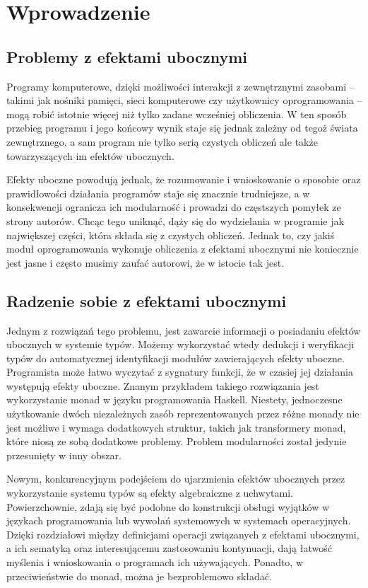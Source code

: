\documentclass[shortabstract]{iithesis}
\author         {Jakub Mendyk}
\date          {4 września 2020}                     %
\begin{document}

\chapter{Wprowadzenie}

\section{Problemy z efektami ubocznymi}

Programy komputerowe, dzięki możliwości interakcji z zewnętrznymi zasobami -- takimi jak nośniki pamięci, sieci komputerowe czy użytkownicy oprogramowania -- mogą robić istotnie więcej niż tylko zadane wcześniej obliczenia. W ten sposób przebieg programu i jego końcowy wynik staje się jednak zależny od tegoż świata zewnętrznego, a sam program nie tylko serią czystych obliczeń ale także towarzyszących im efektów ubocznych.

Efekty uboczne powodują jednak, że rozumowanie i wnioskowanie o sposobie oraz prawidłowości działania programów staje się znacznie trudniejsze, a w konsekwencji ogranicza ich modularność i prowadzi do częstszych pomyłek ze strony autorów. Chcąc tego uniknąć, dąży się do wydzielania w programie jak największej części, która składa się z czystych obliczeń. Jednak to, czy jakiś moduł oprogramowania wykonuje obliczenia z efektami ubocznymi nie koniecznie jest jasne i często musimy zaufać autorowi, że w istocie tak jest.

\section{Radzenie sobie z efektami ubocznymi}

Jednym z rozwiązań tego problemu, jest zawarcie informacji o posiadaniu efektów ubocznych w systemie typów. Możemy wykorzystać wtedy dedukcji i weryfikacji typów do automatycznej identyfikacji modułów zawierających efekty uboczne. Programista może łatwo wyczytać z sygnatury funkcji, że w czasiej jej działania występują efekty uboczne. Znanym przykładem takiego rozwiązania jest wykorzystanie monad w języku programowania Haskell. Niestety, jednoczesne użytkowanie dwóch niezależnych zasób reprezentowanych przez różne monady nie jest możliwe i wymaga dodatkowych struktur, takich jak transformery monad, które niosą ze sobą dodatkowe problemy. Problem modularności został jedynie przesunięty w inny obszar.

Nowym, konkurencyjnym podejściem do ujarzmienia efektów ubocznych przez wykorzystanie systemu typów są efekty algebraiczne z uchwytami. Powierzchownie, zdają się być podobne do konstrukcji obsługi wyjątków w językach programowania lub wywołań systemowych w systemach operacyjnych. Dzięki rozdziałowi między definicjami operacji związanych z efektami ubocznymi, a ich sematyką oraz interesującemu zastosowaniu kontynuacji, dają łatwość myślenia i wnioskowania o programach ich używających. Ponadto, w przeciwieństwie do monad, można je bezproblemowo składać.
\end{document}
